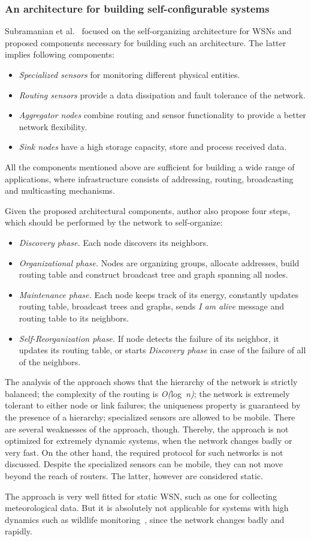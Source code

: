 \subsubsection*{An architecture for building self-configurable systems}

Subramanian et al.~\cite{subramanian00} focused on the self-organizing architecture for WSNs and
proposed components necessary for building such an architecture. The latter
implies following components:

\begin{itemize}
\item \emph{Specialized sensors} for monitoring different physical entities.
\item \emph{Routing sensors} provide a data dissipation and fault tolerance of the network.
\item \emph{Aggregator nodes} combine routing and sensor functionality to
provide a better network flexibility.
\item \emph{Sink nodes} have a high storage capacity, store and process received data.
\end{itemize}
All the components mentioned above are sufficient for building a wide range of
applications, where infrastructure consists of addressing, routing, broadcasting
and multicasting mechanisms.

Given the proposed architectural components, author also propose four steps,
which should be performed by the network to self-organize:

\begin{itemize}
\item \emph{Discovery phase.} Each node discovers its neighbors.
\item \emph{Organizational phase.} Nodes are organizing groups, allocate
addresses, build routing table and construct broadcast tree and graph spanning
all nodes.
\item \emph{Maintenance phase.} Each node keeps track of its energy, constantly
updates routing table, broadcast trees and graphs, sends \emph{I am alive}
message and routing table to its neighbors.
\item \emph{Self-Reorganization phase.} If node detects the failure of its
neighbor, it updates its routing table, or starts \emph{Discovery phase} in case
of the failure of all of the neighbors.
\end{itemize}

The analysis of the approach shows that the hierarchy of the network is strictly
balanced; the complexity of the routing is \emph{O(}log~\emph{n)}; the network is
extremely tolerant to either node or link failures; the uniqueness property is
guaranteed by the presence of a hierarchy; specialized sensors are allowed to be
mobile. There are several weaknesses of the approach, though. Thereby,
the approach is not optimized for extremely dynamic systems, when the network
changes badly or very fast. On the other hand, the required protocol for such
networks is not discussed. Despite the specialized sensors can be mobile, they
can not move beyond the reach of routers. The latter, however are considered static.

The approach is very well fitted for static WSN, such as one for collecting
meteorological data. But it is absolutely not applicable for systems with high
dynamics such as wildlife monitoring~\cite{Pasztor10}, since the network changes
badly and rapidly.
